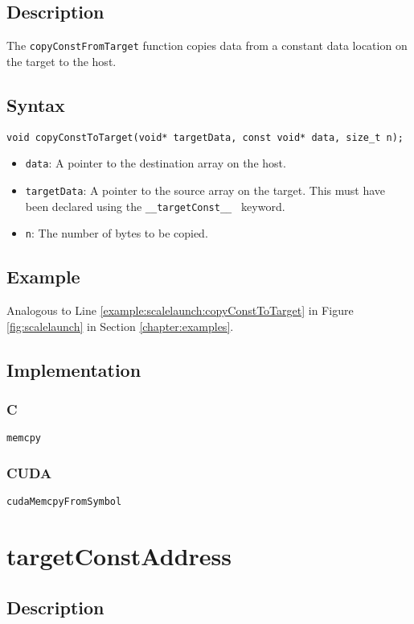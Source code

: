 \subsection{Description}

The \verb+copyConstFromTarget+ function copies data from a constant data location on the target to the host.

\subsection{Syntax}
\begin{verbatim}
void copyConstToTarget(void* targetData, const void* data, size_t n);
\end{verbatim}

\begin{itemize}
\item \verb+data+: A pointer to the destination array on the host.
\item \verb+targetData+: A pointer to the source array on the target. This must have been declared using the \verb+__targetConst__ + keyword.
\item \verb+n+: The number of bytes to be copied.
\end{itemize}


\subsection{Example}
Analogous to Line \ref{example:scalelaunch:copyConstToTarget} in Figure \ref{fig:scalelaunch} in Section \ref{chapter:examples}.

\subsection{Implementation}
\subsubsection{C}
\verb+memcpy+
\subsubsection{CUDA}
\verb+cudaMemcpyFromSymbol+

\newpage
\section{targetConstAddress}

\subsection{Description}

